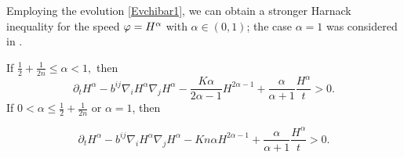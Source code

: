 \documentclass{amsart}
\begin{document}
Employing the evolution \cref{Evchibar1}, we can obtain a stronger Harnack inequality for the speed \(\varphi = H^{\alpha}\) with \(\alpha \in (0,1)\); the case $\alpha=1$ was considered in \cite{2015arXiv150802821B}.
\begin{theorem}\label{thm: main 1}
If $\frac{1}{2}+\frac{1}{2n}\leq {\alpha}< 1,$ then
\[
\partial_t H^{\alpha} - b^{ij}\nabla_iH^{\alpha}\nabla_jH^{\alpha} - \frac{K {\alpha}}{2{\alpha}-1}H^{2{\alpha}-1} + \frac{{\alpha}}{{\alpha}+1} \frac{H^{\alpha}}{t} > 0.
\]
If $0<{\alpha}\leq \frac{1}{2} + \frac{1}{2n}$ or $\alpha=1$, then

\[
\partial_t H^{\alpha} - b^{ij}\nabla_iH^{\alpha}\nabla_jH^{\alpha} - K n{\alpha}H^{2{\alpha}-1} + \frac{{\alpha}}{{\alpha}+1} \frac{H^{\alpha}}{t} > 0.
\]
\end{theorem}
\end{document}
